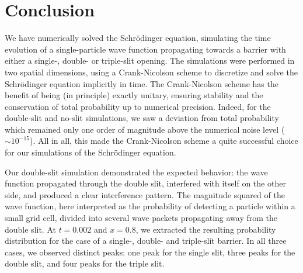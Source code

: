 \documentclass[aps,pra,reprint,amsmath,amssymb,twocolumn,preprintnumbers,superscriptaddress,10pt]{revtex4-2}
\begin{document}



\section{Conclusion}    \label{sec:conclusion}
We have numerically solved the Schrödinger equation, simulating the time evolution of a single-particle wave function propagating towards a barrier with either a single-, double- or triple-slit opening.
The simulations were performed in two spatial dimensions, using a Crank-Nicolson scheme to discretize and solve the Schrödinger equation implicitly in time.
The Crank-Nicolson scheme has the benefit of being (in principle) exactly unitary, ensuring stability and the conservation of total probability up to numerical precision.
Indeed, for the double-slit and no-slit simulations, we saw a deviation from total probability which remained only one order of magnitude above the numerical noise level (\(\sim 10^{-15}\)).
All in all, this made the Crank-Nicolson scheme a quite successful choice for our simulations of the Schrödinger equation.

Our double-slit simulation demonstrated the expected behavior: the wave function propagated through the double slit, interfered with itself on the other side, and produced a clear interference pattern. 
The magnitude squared of the wave function, here interpreted as the probability of detecting a particle within a small grid cell, divided into several wave packets propagating away from the double slit.
At \(t=0.002\) and \(x=0.8\), we extracted the resulting probability distribution for the case of a single-, double- and triple-slit barrier. 
In all three cases, we observed distinct peaks: one peak for the single slit, three peaks for the double slit, and four peaks for the triple slit.
\end{document}

